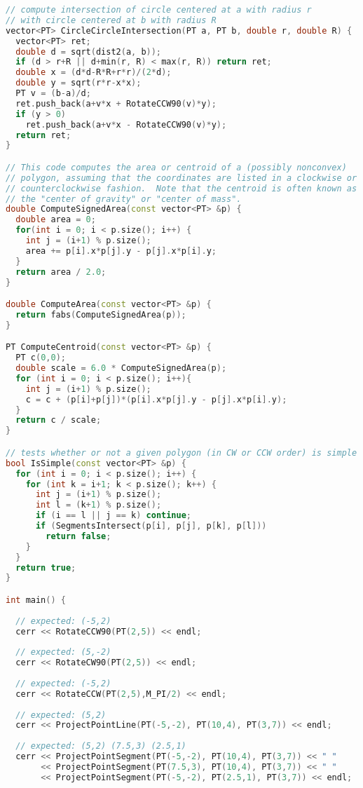 \begin{lstlisting}[language=C++]
// compute intersection of circle centered at a with radius r
// with circle centered at b with radius R
vector<PT> CircleCircleIntersection(PT a, PT b, double r, double R) {
  vector<PT> ret;
  double d = sqrt(dist2(a, b));
  if (d > r+R || d+min(r, R) < max(r, R)) return ret;
  double x = (d*d-R*R+r*r)/(2*d);
  double y = sqrt(r*r-x*x);
  PT v = (b-a)/d;
  ret.push_back(a+v*x + RotateCCW90(v)*y);
  if (y > 0)
    ret.push_back(a+v*x - RotateCCW90(v)*y);
  return ret;
}

// This code computes the area or centroid of a (possibly nonconvex)
// polygon, assuming that the coordinates are listed in a clockwise or
// counterclockwise fashion.  Note that the centroid is often known as
// the "center of gravity" or "center of mass".
double ComputeSignedArea(const vector<PT> &p) {
  double area = 0;
  for(int i = 0; i < p.size(); i++) {
    int j = (i+1) % p.size();
    area += p[i].x*p[j].y - p[j].x*p[i].y;
  }
  return area / 2.0;
}

double ComputeArea(const vector<PT> &p) {
  return fabs(ComputeSignedArea(p));
}

PT ComputeCentroid(const vector<PT> &p) {
  PT c(0,0);
  double scale = 6.0 * ComputeSignedArea(p);
  for (int i = 0; i < p.size(); i++){
    int j = (i+1) % p.size();
    c = c + (p[i]+p[j])*(p[i].x*p[j].y - p[j].x*p[i].y);
  }
  return c / scale;
}

// tests whether or not a given polygon (in CW or CCW order) is simple
bool IsSimple(const vector<PT> &p) {
  for (int i = 0; i < p.size(); i++) {
    for (int k = i+1; k < p.size(); k++) {
      int j = (i+1) % p.size();
      int l = (k+1) % p.size();
      if (i == l || j == k) continue;
      if (SegmentsIntersect(p[i], p[j], p[k], p[l])) 
        return false;
    }
  }
  return true;
}

int main() {
  
  // expected: (-5,2)
  cerr << RotateCCW90(PT(2,5)) << endl;
  
  // expected: (5,-2)
  cerr << RotateCW90(PT(2,5)) << endl;
  
  // expected: (-5,2)
  cerr << RotateCCW(PT(2,5),M_PI/2) << endl;
  
  // expected: (5,2)
  cerr << ProjectPointLine(PT(-5,-2), PT(10,4), PT(3,7)) << endl;
  
  // expected: (5,2) (7.5,3) (2.5,1)
  cerr << ProjectPointSegment(PT(-5,-2), PT(10,4), PT(3,7)) << " "
       << ProjectPointSegment(PT(7.5,3), PT(10,4), PT(3,7)) << " "
       << ProjectPointSegment(PT(-5,-2), PT(2.5,1), PT(3,7)) << endl;
  

\end{lstlisting}
